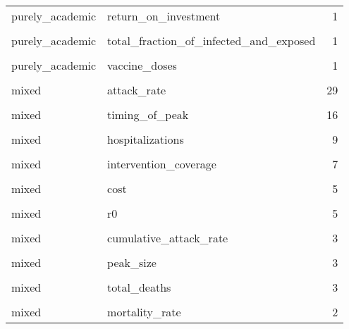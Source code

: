 \documentclass[
]{article}
\begin{document}
\begin{longtable}[t]{llr}
purely\_academic & return\_on\_investment & 1\\
\cellcolor{gray!6}{purely\_academic} & \cellcolor{gray!6}{risk\_of\_death} & \cellcolor{gray!6}{1}\\
purely\_academic & total\_fraction\_of\_infected\_and\_exposed & 1\\
\addlinespace
\cellcolor{gray!6}{purely\_academic} & \cellcolor{gray!6}{transmission} & \cellcolor{gray!6}{1}\\
purely\_academic & vaccine\_doses & 1\\
\cellcolor{gray!6}{mixed} & \cellcolor{gray!6}{final\_epidemic\_size} & \cellcolor{gray!6}{31}\\
mixed & attack\_rate & 29\\
\cellcolor{gray!6}{mixed} & \cellcolor{gray!6}{cases\_averted} & \cellcolor{gray!6}{22}\\
\addlinespace
mixed & timing\_of\_peak & 16\\
\cellcolor{gray!6}{mixed} & \cellcolor{gray!6}{outbreak\_duration\_and\_timing} & \cellcolor{gray!6}{13}\\
mixed & hospitalizations & 9\\
\cellcolor{gray!6}{mixed} & \cellcolor{gray!6}{incidence} & \cellcolor{gray!6}{7}\\
mixed & intervention\_coverage & 7\\
\addlinespace
\cellcolor{gray!6}{mixed} & \cellcolor{gray!6}{case\_fatality} & \cellcolor{gray!6}{5}\\
mixed & cost & 5\\
\cellcolor{gray!6}{mixed} & \cellcolor{gray!6}{cumulative\_incidence} & \cellcolor{gray!6}{5}\\
mixed & r0 & 5\\
\cellcolor{gray!6}{mixed} & \cellcolor{gray!6}{peak\_magnitude} & \cellcolor{gray!6}{4}\\
\addlinespace
mixed & cumulative\_attack\_rate & 3\\
\cellcolor{gray!6}{mixed} & \cellcolor{gray!6}{cumulative\_cases} & \cellcolor{gray!6}{3}\\
mixed & peak\_size & 3\\
\cellcolor{gray!6}{mixed} & \cellcolor{gray!6}{qualys} & \cellcolor{gray!6}{3}\\
mixed & total\_deaths & 3\\
\addlinespace
\cellcolor{gray!6}{mixed} & \cellcolor{gray!6}{cumulative\_deaths} & \cellcolor{gray!6}{2}\\
mixed & mortality\_rate & 2\\

\end{longtable}
\end{document}
